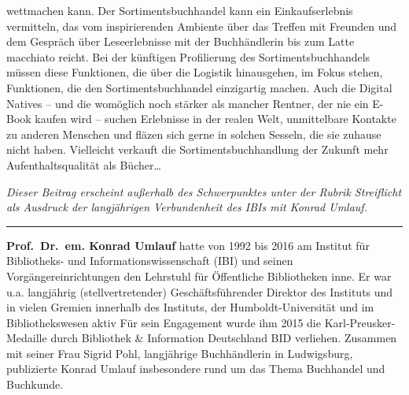 \documentclass[a4paper,
fontsize=11pt,
oneside,
numbers=noperiodatend,
parskip=half-,
bibliography=totoc,
final
]{scrartcl}
\begin{document}
\begin{itemize}
  wettmachen kann. Der Sortimentsbuchhandel kann ein Einkaufserlebnis
  vermitteln, das vom inspirierenden Ambiente über das Treffen mit
  Freunden und dem Gespräch über Leseerlebnisse mit der Buchhändlerin
  bis zum Latte macchiato reicht. Bei der künftigen Profilierung des
  Sortimentsbuchhandels müssen diese Funktionen, die über die Logistik
  hinausgehen, im Fokus stehen, Funktionen, die den Sortimentsbuchhandel
  einzigartig machen. Auch die Digital Natives -- und die womöglich noch
  stärker als mancher Rentner, der nie ein E-Book kaufen wird -- suchen
  Erlebnisse in der realen Welt, unmittelbare Kontakte zu anderen
  Menschen und fläzen sich gerne in solchen Sesseln, die sie zuhause
  nicht haben. Vielleicht verkauft die Sortimentsbuchhandlung der
  Zukunft mehr Aufenthaltsqualität als Bücher\ldots{}
\end{itemize}

\emph{Dieser Beitrag erscheint außerhalb des Schwerpunktes unter der
Rubrik Streiflicht als Ausdruck der langjährigen Verbundenheit des IBIs
mit Konrad Umlauf.}

\begin{center}\rule{0.5\linewidth}{\linethickness}\end{center}

\textbf{Prof.~Dr.~em. Konrad Umlauf} hatte von 1992 bis 2016 am Institut
für Bibliotheks- und Informationswissenschaft (IBI) und seinen
Vorgängereinrichtungen den Lehrstuhl für Öffentliche Bibliotheken inne.
Er war u.a. langjährig (stellvertretender) Geschäftsführender Direktor
des Instituts und in vielen Gremien innerhalb des Instituts, der
Humboldt-Universität und im Bibliothekswesen aktiv Für sein Engagement
wurde ihm 2015 die Karl-Preusker-Medaille durch Bibliothek \&
Information Deutschland BID verliehen. Zusammen mit seiner Frau Sigrid
Pohl, langjährige Buchhändlerin in Ludwigsburg, publizierte Konrad
Umlauf insbesondere rund um das Thema Buchhandel und Buchkunde.
\end{document}
